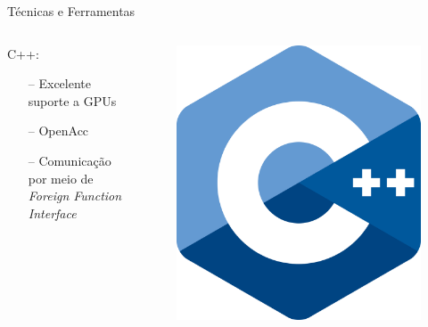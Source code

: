 \begin{frame}{Técnicas e Ferramentas}
    \begin{columns}
    \begin{column}{0.9\textwidth}
    C++:
    \begin{itemize}
        \item[--] Excelente suporte a GPUs
        \item[--] OpenAcc
        \item[--] Comunicação por meio de \textit{Foreign Function Interface}
    \end{itemize}
    \end{column}

    \begin{column}{0.1\textwidth}
        \begin{figure}
            \includegraphics[width=\textwidth]{Figuras/C++ Logo.png}
        \end{figure}
    \end{column}
    \end{columns}
\end{frame}

